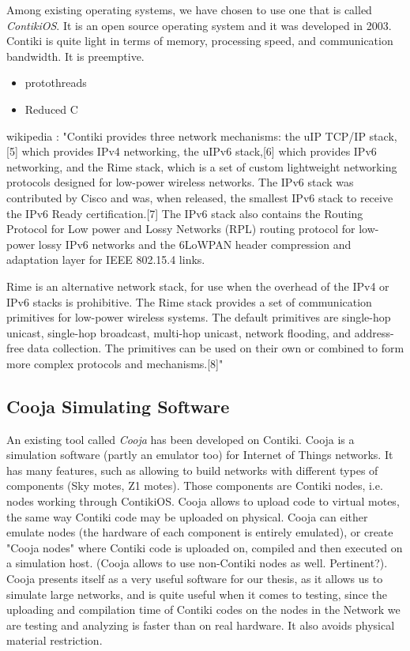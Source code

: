Among existing operating systems, we have chosen to use one that is called \textit{ContikiOS}. It is an open source operating system and it was developed in 2003. Contiki is quite light in terms of memory, processing speed, and communication bandwidth. It is preemptive.\\


\begin{itemize}
\item protothreads
\item Reduced C
\end{itemize}
wikipedia : "Contiki provides three network mechanisms: the uIP TCP/IP stack,[5] which provides IPv4 networking, the uIPv6 stack,[6] which provides IPv6 networking, and the Rime stack, which is a set of custom lightweight networking protocols designed for low-power wireless networks. The IPv6 stack was contributed by Cisco and was, when released, the smallest IPv6 stack to receive the IPv6 Ready certification.[7] The IPv6 stack also contains the Routing Protocol for Low power and Lossy Networks (RPL) routing protocol for low-power lossy IPv6 networks and the 6LoWPAN header compression and adaptation layer for IEEE 802.15.4 links.

Rime is an alternative network stack, for use when the overhead of the IPv4 or IPv6 stacks is prohibitive. The Rime stack provides a set of communication primitives for low-power wireless systems. The default primitives are single-hop unicast, single-hop broadcast, multi-hop unicast, network flooding, and address-free data collection. The primitives can be used on their own or combined to form more complex protocols and mechanisms.[8]"

\subsection{Cooja Simulating Software}
An existing tool called \textit{Cooja} has been developed on Contiki. Cooja is a simulation software (partly an emulator too) for Internet of Things networks. It has many features, such as allowing to build networks with different types of components (Sky motes, Z1 motes). Those components are Contiki nodes, i.e. nodes working through ContikiOS. Cooja allows to upload code to virtual motes, the same way Contiki code may be uploaded on physical. Cooja can either emulate nodes (the hardware of each component is entirely emulated), or create "Cooja nodes" where Contiki code is uploaded on, compiled and then executed on a simulation host. (Cooja allows to use non-Contiki nodes as well. Pertinent?). Cooja presents itself as a very useful software for our thesis, as it allows us to simulate large networks, and is quite useful when it comes to testing, since the uploading and compilation time of Contiki codes on the nodes in the Network we are testing and analyzing is faster than on real hardware. It also avoids physical material restriction.

